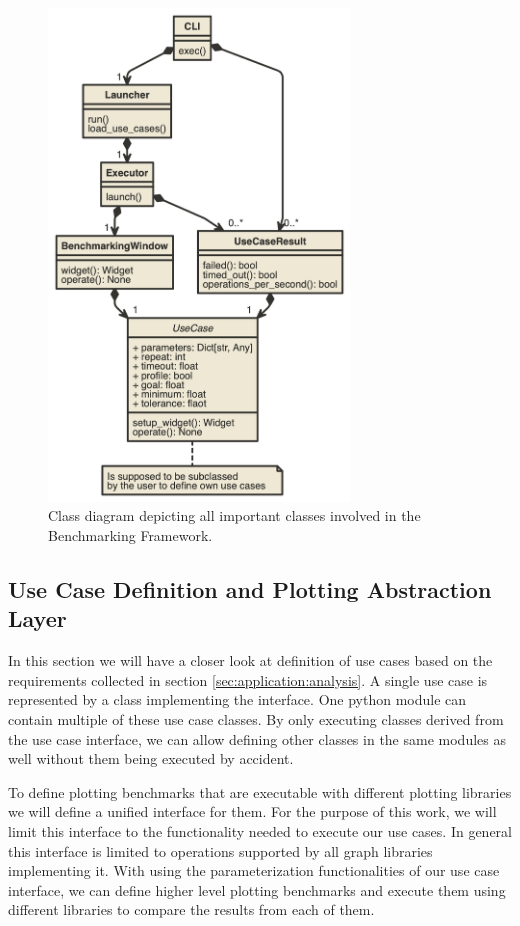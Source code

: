\begin{figure}[h]
    \centering
    \includegraphics[width=8cm]{resources/img/class/widgetmark}
    \caption{
        Class diagram depicting all important classes involved in the
        Benchmarking Framework. 
    }
    \label{fig:application:design:classdiagram:widgetmark}
\end{figure}

\clearpage

\subsection{Use Case Definition and Plotting Abstraction Layer}

\label{sec:application:design:usecases}

In this section we will have a closer look at definition of use cases based on
the requirements collected in section \ref{sec:application:analysis}. A
single use case is represented by a class implementing the
 interface. One python module can contain multiple
of these use case classes. By only executing classes derived from the use case
interface, we can allow defining other classes in the same modules as well
without them being executed by accident.

To define plotting benchmarks that are executable with different plotting
libraries we will define a unified interface for them. For the purpose of this
work, we will limit this interface to the functionality needed to execute our
use cases. In general this interface is limited to operations supported by all
graph libraries implementing it. With using the parameterization functionalities
of our use case interface, we can define higher level plotting benchmarks and
execute them using different libraries to compare the results from each of them.

